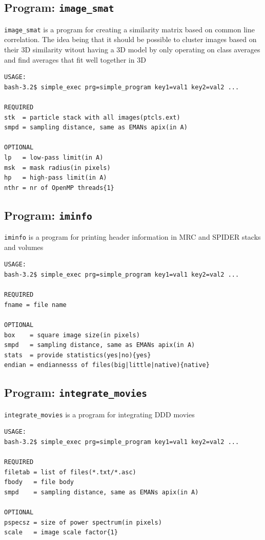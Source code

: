 \documentclass[a4paper,11pt]{article}
\newcommand{\prgname}[1]{\textcolor{NavyBlue}{\texttt{#1}}}
\begin{document}
\subsection{Program: \prgname{image\_smat}}
\label{image_smat}
\prgname{image\_smat} is a program for creating a similarity matrix based on common line correlation. The idea being that it should be possible to cluster images based on their 3D similarity witout having a 3D model by only operating on class averages and find averages that fit well together in 3D

\begin{verbatim}
USAGE:
bash-3.2$ simple_exec prg=simple_program key1=val1 key2=val2 ...

REQUIRED
stk  = particle stack with all images(ptcls.ext)
smpd = sampling distance, same as EMANs apix(in A)

OPTIONAL
lp   = low-pass limit(in A)
msk  = mask radius(in pixels)
hp   = high-pass limit(in A)
nthr = nr of OpenMP threads{1}
\end{verbatim}

\subsection{Program: \prgname{iminfo}}
\label{iminfo}
\prgname{iminfo} is a program for printing header information in MRC and SPIDER stacks and volumes

\begin{verbatim}
USAGE:
bash-3.2$ simple_exec prg=simple_program key1=val1 key2=val2 ...

REQUIRED
fname = file name

OPTIONAL
box    = square image size(in pixels)
smpd   = sampling distance, same as EMANs apix(in A)
stats  = provide statistics(yes|no){yes}
endian = endiannesss of files(big|little|native){native}
\end{verbatim}

\subsection{Program: \prgname{integrate\_movies}}
\label{integrate_movies}
\prgname{integrate\_movies} is a program for integrating DDD movies

\begin{verbatim}
USAGE:
bash-3.2$ simple_exec prg=simple_program key1=val1 key2=val2 ...

REQUIRED
filetab = list of files(*.txt/*.asc)
fbody   = file body
smpd    = sampling distance, same as EMANs apix(in A)

OPTIONAL
pspecsz = size of power spectrum(in pixels)
scale   = image scale factor{1}
\end{verbatim}
\end{document}

